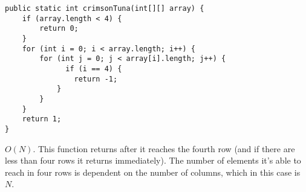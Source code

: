 \begin{blocksection}
\question

\begin{lstlisting}
public static int crimsonTuna(int[][] array) {
    if (array.length < 4) {
        return 0;
    }
    for (int i = 0; i < array.length; i++) {
        for (int j = 0; j < array[i].length; j++) {
              if (i == 4) {
                return -1;
            }
        }
    }
    return 1;
}
\end{lstlisting}

\begin{solution}
$O(N)$. This function returns after it reaches the fourth row (and if there are
less than four rows it returns immediately). The number of elements it's able
to reach in four rows is dependent on the number of columns, which in this case
is $N$.
\end{solution}
\end{blocksection}
